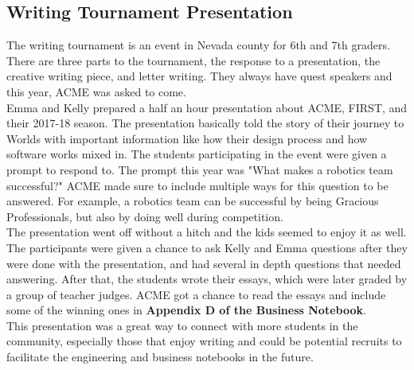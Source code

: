 \documentclass{article}
\begin{document}
\subsection{Writing Tournament Presentation}
The writing tournament is an event in Nevada county for 6th and 7th graders. There are three parts to the tournament, the response to a presentation, the creative writing piece, and letter writing. They always have quest speakers and this year, ACME was asked to come. \\

Emma and Kelly prepared a half an hour presentation about ACME, FIRST, and  their 2017-18 season. The presentation basically told the story of their journey to Worlds with important information like how their design process and how software works mixed in. The students participating in the event were given a prompt to respond to. The prompt this year was "What makes a robotics team successful?" ACME made sure to include multiple ways for this question to be answered. For example, a robotics team can be successful by being Gracious Professionals, but also by doing well during competition. \\

The presentation went off without a hitch and the kids seemed to enjoy it as well. The participants were given a chance to ask Kelly and Emma questions after they were done with the presentation, and had several in depth questions that needed answering. After that, the students wrote their essays, which were later graded by a group of teacher judges. ACME got a chance to read the essays and include some of the winning ones in \textbf{Appendix D of the Business Notebook}. \\

This presentation was a great way to connect with more students in the community, especially those that enjoy writing and could be potential recruits to facilitate the engineering and business notebooks in the future. \\
\end{document}
